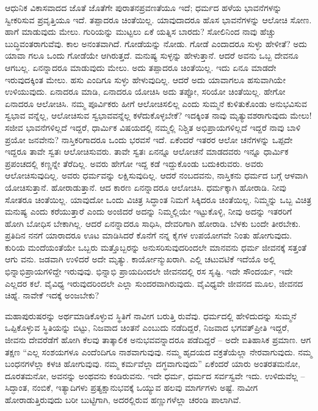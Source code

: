 ಆಧುನಿಕ ವಿಕಾಸವಾದದ ಜೊತೆ ಜೊತೆಗೇ ಪುರಾತನಪ್ರವಣತೆಯೂ  ಇದೆ; ಧರ್ಮದ ಹಳೆಯ ಭಾವನೆಗಳನ್ನು ಸ್ವೀಕರಿಸುವ ಪ್ರವೃತ್ತಿಯೂ ಇದೆ. ತಪ್ಪಾದರೂ ಚಿಂತೆಯಿಲ್ಲ. ಯಾವುದಾದರೂ ಹೊಸ ಭಾವನೆಗಳನ್ನು ಆಲೋಚಿ ಸೋಣ. ಹಾಗೆ ಮಾಡುವುದು ಮೇಲು. ಗುರಿಯನ್ನು ಮುಟ್ಟಲು ಏಕೆ ಯತ್ನಿಸ ಬಾರದು? ಸೋಲಿನಿಂದ ನಾವು ಹೆಚ್ಚು ಬುದ್ಧಿವಂತರಾಗುವೆವು. ಕಾಲ ಅನಂತವಾಗಿದೆ. ಗೋಡೆಯನ್ನು ನೋಡು. ಗೋಡೆ ಎಂದಾದರೂ ಸುಳ್ಳು ಹೇಳೀತೆ? ಅದು ಯಾವಾ ಗಲೂ ಒಂದು ಗೋಡೆಯೇ ಆಗಿರುತ್ತದೆ. ಮನುಷ್ಯ ಸುಳ್ಳನ್ನು ಹೇಳುತ್ತಾನೆ. ಆದರೆ ಅವನು ಒಬ್ಬ ದೇವನೂ ಆಗಬಲ್ಲ. ಏನನ್ನಾದರೂ ಮಾಡುವುದು ಮೇಲು. ಅದು ತಪ್ಪಾದರೂ ಚಿಂತೆಯಿಲ್ಲ. ಇದು ಏನೂ ಮಾಡದೇ ಇರುವುದಕ್ಕಿಂತ ಮೇಲು. ಹಸು ಎಂದಿಗೂ ಸುಳ್ಳು ಹೇಳುವುದಿಲ್ಲ. ಆದರೆ ಅದು ಯಾವಾಗಲೂ ಹಸುವಾಗಿಯೇ ಉಳಿಯುವುದು. ಏನಾದರೂ ಮಾಡಿ, ಏನಾದರೂ ಯೋಚಿಸಿ ಅದು ತಪ್ಪೋ, ಸರಿಯೋ ಚಿಂತೆಯಿಲ್ಲ. ಹೇಗೋ ಏನಾದರೂ ಆಲೋಚಿಸಿ. ನಮ್ಮ ಪೂರ್ವಿಕರು ಹೀಗೆ ಆಲೋಚಿಸಲಿಲ್ಲ ಎಂದು ಸುಮ್ಮನೆ ಕುಳಿತುಕೊಂಡು ಅನುಭವಿಸುವ ಸ್ವಭಾವ ವನ್ನೆಲ್ಲ, ಆಲೋಚಿಸುವ ಸ್ವಭಾವವನ್ನೆಲ್ಲ ಕಳೆದುಕೊಳ್ಳಬೇಕೆ? ಇದಕ್ಕಿಂತ ನಾವು ಮೃತ್ಯುವಶರಾಗುವುದು ಮೇಲು! ಸಜೀವ ಭಾವನೆಗಳಿಲ್ಲದೆ ಇದ್ದರೆ, ಧಾರ್ಮಿಕ ವಿಷಯದಲ್ಲಿ ನಮ್ಮಲ್ಲಿ ನಿಶ್ಚಿತ ಅಭಿಪ್ರಾಯಗಳಿಲ್ಲದೆ ಇದ್ದರೆ ನಾವು ಬಾಳಿ ಪ್ರಯೋ ಜನವೇನು? ನಾಸ್ತಿಕರಿಗಾದರೂ ಒಂದು ಭರವಸೆ ಇದೆ. ಏಕೆಂದರೆ ಇತರರ ಆಲೋ ಚನೆಗಳನ್ನು ಒಪ್ಪದೇ ಇದ್ದರೂ ತಾವೇ ಸ್ವತಃ ಆಲೋಚಿಸುವರು. ತಾವೇ ಸ್ವತಃ ಏನನ್ನೂ ಆಲೋಚನೆ ಮಾಡದವರು ಇನ್ನೂ ಧಾರ್ಮಿಕ ಪ್ರಪಂಚದಲ್ಲಿ ಕಣ್ಣನ್ನೇ ತೆರೆದಿಲ್ಲ. ಅವರು ಹೇಗೋ ಇದ್ದ ಕಡೆ ಇದ್ದುಕೊಂಡು ಬದುಕಿರುವರು. ಅವರು ಆಲೋಚಿಸುವುದಿಲ್ಲ. ಅವರು ಧರ್ಮವನ್ನು ಲಕ್ಷಿಸುವುದಿಲ್ಲ. ಆದರೆ ನಂಬದವನು, ನಾಸ್ತಿಕನು ಧರ್ಮದ ಬಗ್ಗೆ ಆಳವಾಗಿ ಯೋಚಿಸುತ್ತಾನೆ. ಹೋರಾಡುತ್ತಾನೆ. ಆದ ಕಾರಣ ಏನನ್ನಾದರೂ ಆಲೋಚಿಸಿ. ಧರ್ಮಕ್ಕಾಗಿ ಹೋರಾಡಿ. ನೀವು ಸೋತರೂ ಚಿಂತೆಯಿಲ್ಲ. ಯಾವುದೋ ಒಂದು ವಿಚಿತ್ರ ಸಿದ್ಧಾಂತ ನಿಮಗೆ ಸಿಕ್ಕಿದರೂ ಚಿಂತೆಯಿಲ್ಲ. ನಿಮ್ಮನ್ನು ಒಬ್ಬ ವಿಚಿತ್ರ ಮನುಷ್ಯ ಎಂದು ಕರೆಯುತ್ತಾರೆ ಎಂದು ಅಂಜಿದರೆ ಅದನ್ನು ನಿಮ್ಮಲ್ಲಿಯೇ ಇಟ್ಟುಕೊಳ್ಳಿ, ನೀವು ಅದನ್ನು ಇತರರಿಗೆ ಹೋಗಿ ಬೋಧಿಸ ಬೇಕಾಗಿಲ್ಲ. ಆದರೆ ಏನನ್ನಾದರೂ ಸಾಧಿಸಿ, ದೇವರಿಗಾಗಿ ಹೋರಾಡಿ. ಬೆಳಕು ಬಂದೇ ತೀರಬೇಕು. ಪ್ರತಿದಿನ ನನಗೆ ಯಾರಾದರೂ ಊಟ ಮಾಡಿಸಿದರೆ ಕೊನೆಗೆ ನನ್ನ ಕೈಗಳ ಉಪಯೋಗವೇ ನಿಂತು ಹೋಗುವುದು. ಕುರಿಯ ಮಂದೆಯಂತೆಯೇ ಒಬ್ಬರು ಮತ್ತೊಬ್ಬರನ್ನು ಅನುಸರಿಸುವುದರಿಂದಲೇ ಮಾನವನು ಧರ್ಮ ಜೀವನಕ್ಕೆ ಸತ್ತಂತೆ ಆಗು ವನು. ಜಡವಾಗಿ ಉಳಿದರೆ ಅದೇ ಮೃತ್ಯು. ಕಾರ್ಯೋನ್ಮುಖರಾಗಿ. ಎಲ್ಲಿ ಚಟುವಟಿಕೆ ಇದೆಯೊ ಅಲ್ಲಿ ಭಿನ್ನಾಭಿಪ್ರಾಯಗಳಿದ್ದೇ ಇರುವುವು. ಭಿನ್ನಾಭಿ ಪ್ರಾಯದಿಂದಲೇ ಜೀವನದಲ್ಲಿ ರಸ ಸೃಷ್ಟಿ. ಇದೇ ಸೌಂದರ್ಯ, ಇದೇ ಎಲ್ಲದರ ಕಲೆ. ವೈವಿಧ್ಯ ಇರುವುದರಿಂದಲೇ ಎಲ್ಲಾ ಸುಂದರವಾಗಿರುವುದು. ವೈವಿಧ್ಯವೇ ಜೀವನದ ಮೂಲ, ಜೀವನದ ಚಿಹ್ನೆ. ನಾವೇಕೆ ಇದಕ್ಕೆ ಅಂಜಬೇಕು?

ಮಹಾಪುರುಷರನ್ನು ಅರ್ಥಮಾಡಿಕೊಳ್ಳುವ ಸ್ಥಿತಿಗೆ ನಾವೀಗ ಬರುತ್ತಿ ರುವೆವು. ಧರ್ಮದಲ್ಲಿ ಹೇಳಿದುದನ್ನು ಸುಮ್ಮನೆ ಒಪ್ಪಿಕೊಳ್ಳುವ ಸ್ಥಿತಿಯನ್ನು ಬಿಟ್ಟು, ನಿಜವಾದ ಚಿಂತನೆ ಎಂಬುದು ನಡೆದಿದ್ದರೆ, ನಿಜವಾದ ಭಗವತ್​ಪ್ರೀತಿ ಇದ್ದರೆ, ಜೀವನು ದೇವರೆಡೆಗೆ ಹೋಗಿ ಕೆಲವು ತಾತ್ಕಾಲಿಕ ಅನುಭವವನ್ನಾದರೂ ಪಡೆದಿದ್ದರೆ – ಅದೇ ಐತಿಹಾಸಿಕ ಪ್ರಮಾಣ. ಆಗ ತಕ್ಷಣ “ಎಲ್ಲ ಸಂಶಯಗಳೂ ಎಂದೆಂದಿಗೂ ನಾಶವಾಗುವುವು. ನಮ್ಮ ಹೃದಯದ ವಕ್ರತೆಯೆಲ್ಲಾ ನೇರವಾಗುವುದು. ನಮ್ಮ ಬಂಧನಗಳೆಲ್ಲಾ ಕಳಚಿ ಹೋಗುವುವು. ನಮ್ಮ ಕರ್ಮವೆಲ್ಲಾ ದಗ್ಧವಾಗುವುದು” ಏಕೆಂದರೆ ಯಾರು ಅಂತರತಮನೋ, ದೂರತಮನೋ, ಅವನನ್ನು ಅಂಥವನು ಕಂಡಿರುವನು. ಇದೇ ಧರ್ಮ, ಧರ್ಮದ ಸರ್ವಸ್ವವೇ ಇದು. ಉಳಿದುವೆಲ್ಲ – ಸಿದ್ಧಾಂತ, ನಂಬಿಕೆ, ಇತ್ಯಾದಿಗಳು ಪ್ರತ್ಯಕ್ಷಾನುಭವಕ್ಕೆ ಒಯ್ಯುವ ಹಲವು ಮಾರ್ಗಗಳು ಅಷ್ಟೆ. ನಾವೀಗ ಹೋರಾಡುತ್ತಿರುವುದು ಬರೀ ಬುಟ್ಟಿಗಾಗಿ, ಅದರಲ್ಲಿರುವ ಹಣ್ಣುಗಳೆಲ್ಲಾ ಚರಂಡಿ ಪಾಲಾಗಿವೆ.

